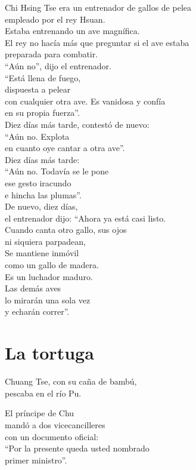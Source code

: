 \documentclass[book,b5paper,hidelinks,final]{memoir}
\begin{document}
	Chi Hsing Tse era un entrenador de gallos de pelea\\
	empleado por el rey Hsuan.\\
	Estaba entrenando un ave magnífica.\\
	El rey no hacía más que preguntar si el ave estaba\\
	preparada para combatir.\\
	``Aún no'', dijo el entrenador.\\
	``Está llena de fuego,\\
	dispuesta a pelear\\
	con cualquier otra ave. Es vanidosa y confía\\
	en su propia fuerza''.\\
	Diez días más tarde, contestó de nuevo:\\
	``Aún no. Explota\\
	en cuanto oye cantar a otra ave''.\\
	Diez días más tarde:\\
	``Aún no. Todavía se le pone\\
	ese gesto iracundo\\
	e hincha las plumas''.\\
	De nuevo, diez días,\\
	el entrenador dijo: ``Ahora ya está casi listo.\\
	Cuando canta otro gallo, sus ojos\\
	ni siquiera parpadean,\\
	Se mantiene inmóvil\\
	como un gallo de madera.\\
	Es un luchador maduro.\\
	Las demás aves\\
	lo mirarán una sola vez\\
	y echarán correr''.
	
	\chapter*{La tortuga}
	
	Chuang Tse, con su caña de bambú,\\
	pescaba en el río Pu.
	
	El príncipe de Chu\\
	mandó a dos vicecancilleres\\
	con un documento oficial:\\
	``Por la presente queda usted nombrado\\
	primer ministro''.
	
\end{document}
